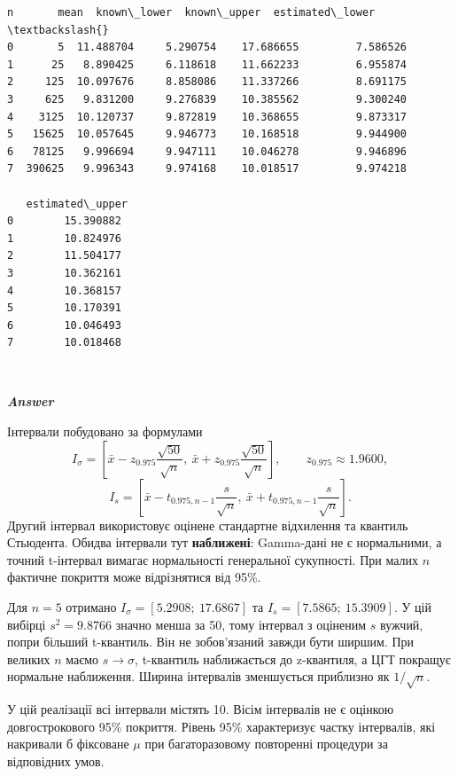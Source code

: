 \documentclass[11pt]{article}
\begin{document}
    
    \begin{Verbatim}[commandchars=\\\{\}]
        n       mean  known\_lower  known\_upper  estimated\_lower  \textbackslash{}
0       5  11.488704     5.290754    17.686655         7.586526   
1      25   8.890425     6.118618    11.662233         6.955874   
2     125  10.097676     8.858086    11.337266         8.691175   
3     625   9.831200     9.276839    10.385562         9.300240   
4    3125  10.120737     9.872819    10.368655         9.873317   
5   15625  10.057645     9.946773    10.168518         9.944900   
6   78125   9.996694     9.947111    10.046278         9.946896   
7  390625   9.996343     9.974168    10.018517         9.974218   

   estimated\_upper  
0        15.390882  
1        10.824976  
2        11.504177  
3        10.362161  
4        10.368157  
5        10.170391  
6        10.046493  
7        10.018468  
    \end{Verbatim}

    
    \begin{center}
    \end{center}
    { \hspace*{\fill} \\}
    
    \textbf{\emph{Answer}}

Інтервали побудовано за формулами
\[I_\sigma=\left[\bar x-z_{0.975}\frac{\sqrt{50}}{\sqrt n},\ \bar x+z_{0.975}\frac{\sqrt{50}}{\sqrt n}\right],\qquad z_{0.975}\approx1.9600,\]
\[I_s=\left[\bar x-t_{0.975,n-1}\frac{s}{\sqrt n},\ \bar x+t_{0.975,n-1}\frac{s}{\sqrt n}\right].\]
Другий інтервал використовує оцінене стандартне відхилення та квантиль
Стьюдента. Обидва інтервали тут \textbf{наближені}: Gamma-дані не є
нормальними, а точний t-інтервал вимагає нормальності генеральної
сукупності. При малих \(n\) фактичне покриття може відрізнятися від
95\%.

Для \(n=5\) отримано \(I_\sigma=[5.2908;\ 17.6867]\) та
\(I_s=[7.5865;\ 15.3909]\). У цій вибірці \(s^2=9.8766\) значно менша за
50, тому інтервал з оціненим \(s\) вужчий, попри більший t-квантиль. Він
не зобов'язаний завжди бути ширшим. При великих \(n\) маємо
\(s\to\sigma\), t-квантиль наближається до z-квантиля, а ЦГТ покращує
нормальне наближення. Ширина інтервалів зменшується приблизно як
\(1/\sqrt n\).

У цій реалізації всі інтервали містять 10. Вісім інтервалів не є оцінкою
довгострокового 95\% покриття. Рівень 95\% характеризує частку
інтервалів, які накривали б фіксоване \(\mu\) при багаторазовому
повторенні процедури за відповідних умов.
\end{document}

